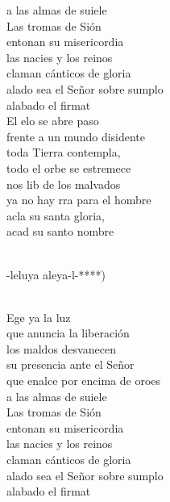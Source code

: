 \documentclass[12pt]{article}
\begin{document}
\begin{multicols*}{2}
\begin{cancion}
	a las almas de suiele\\
	Las tromas de Sión \\
entonan su misericordia\\
	las nacies y los reinos \\
claman cánticos de gloria\\
	alado sea el Señor sobre sumplo\\
	alabado el firmat\\
	El elo se abre paso \\
frente a un mundo disidente\\
	toda  Tierra contempla, \\
todo el orbe se estremece\\
	nos lib de los malvados  \\
	ya no hay rra para el hombre\\
	acla su santa gloria,\\
	 acad su santo nombre\\\jump\\
	\begin{chorus}%
	-leluya aleya-l-*)\\
	\end{chorus}%
	\jump\\
	Ege ya la luz \\
que anuncia la liberación\\
	los maldos desvanecen \\
su presencia ante el Señor\\
	que enalce por encima de oroes\\
	a las almas de suiele\\
	Las tromas de Sión \\
entonan su misericordia\\
	las nacies y los reinos \\
claman cánticos de gloria\\
	alado sea el Señor sobre sumplo\\
	alabado el firmat\\

\end{cancion}
\end{multicols*}
\end{document}

